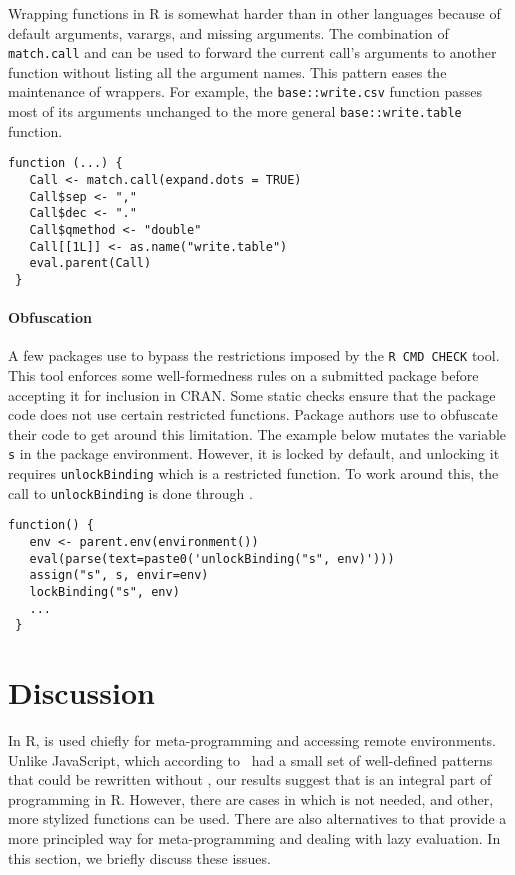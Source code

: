 \documentclass[acmsmall, screen]{acmart}
\renewcommand{\k}[1]{\lstinline |#1|\xspace}
\begin{document}
Wrapping functions in R is somewhat harder than in other languages because of
default arguments, varargs, and missing arguments. The combination of
\k{match.call} and \eval can be used to forward the current call's arguments to
another function without listing all the argument names. This pattern eases the
maintenance of wrappers. For example, the \k{base::write.csv} function passes
most of its arguments unchanged to the more general \k{base::write.table}
function.

\begin{lstlisting}[title={\k{base::write.csv}}, captionpos=b]
 function (...) {
   Call <- match.call(expand.dots = TRUE)
   Call$sep <- ","
   Call$dec <- "."
   Call$qmethod <- "double"
   Call[[1L]] <- as.name("write.table")
   eval.parent(Call)
 }
\end{lstlisting}

\paragraph{Obfuscation} A few packages use \eval to bypass the restrictions
imposed by the \k{R CMD CHECK} tool. This tool enforces some well-formedness
rules on a submitted package before accepting it for inclusion in CRAN. Some
static checks ensure that the package code does not use certain restricted
functions. Package authors use \eval to obfuscate their code to get around this
limitation. The example below mutates the variable \k{s} in the package
environment. However, it is locked by default, and unlocking it requires
\k{unlockBinding} which is a restricted function. To work around this, the call
to \k{unlockBinding} is done through \eval.

\begin{lstlisting}[title={\k{aibd::scalaEnsure}}, captionpos=b]
 function() {
   env <- parent.env(environment())
   eval(parse(text=paste0('unlockBinding("s", env)')))
   assign("s", s, envir=env)
   lockBinding("s", env)
   ...
 }
\end{lstlisting}\medskip

\section{Discussion}

In R, \eval is used chiefly for meta-programming and accessing remote
environments. Unlike JavaScript, which according to~\citet{ecoop11} had a small
set of well-defined patterns that could be rewritten without \eval, our results
suggest that \eval is an integral part of programming in R. However, there are
cases in which \eval is not needed, and other, more stylized functions can be
used. There are also alternatives to \eval that provide a more principled way
for meta-programming and dealing with lazy evaluation. In this section, we
briefly discuss these issues.
\end{document}

